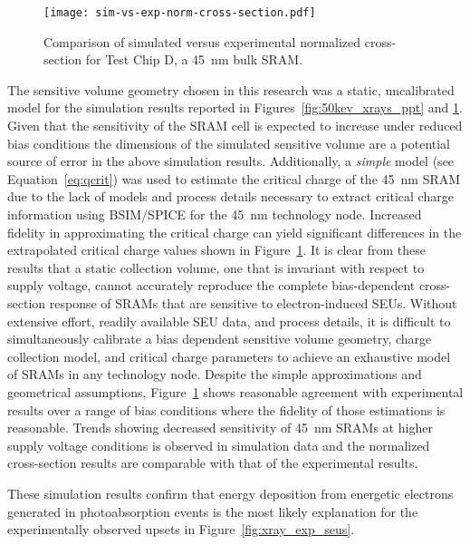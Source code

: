 \begin{figure}[tb]
    \begin{center}
        \texttt{[image: sim-vs-exp-norm-cross-section.pdf]}
    \end{center}
    \caption{Comparison of simulated versus experimental normalized cross-section for Test Chip D, a 45~nm bulk SRAM.}
    \label{fig:sim-vs-exp-norm-cross-section}
\end{figure}

The sensitive volume geometry chosen in this research was a static, uncalibrated model for the simulation results reported in Figures~\ref{fig:50kev_xrays_ppt} and \ref{fig:sim-vs-exp-norm-cross-section}.
Given that the sensitivity of the SRAM cell is expected to increase under reduced bias conditions the dimensions of the simulated sensitive volume are a potential source of error in the above simulation results.
Additionally, a \emph{simple} model (see Equation~\ref{eq:qcrit}) was used to estimate the critical charge of the 45~nm SRAM due to the lack of models and process details necessary to extract critical charge information using BSIM/SPICE for the 45~nm technology node.
Increased fidelity in approximating the critical charge can yield significant differences in the extrapolated critical charge values shown in Figure~\ref{fig:sim-vs-exp-norm-cross-section}.
It is clear from these results that a static collection volume, one that is invariant with respect to supply voltage, cannot accurately reproduce the complete bias-dependent cross-section response of SRAMs that are sensitive to electron-induced SEUs.
Without extensive effort, readily available SEU data, and process details, it is difficult to simultaneously calibrate a bias dependent sensitive volume geometry, charge collection model, and critical charge parameters to achieve an exhaustive model of SRAMs in any technology node.
Despite the simple approximations and geometrical assumptions, Figure~\ref{fig:sim-vs-exp-norm-cross-section} shows reasonable agreement with experimental results over a range of bias conditions where the fidelity of those estimations is reasonable.
Trends showing decreased sensitivity of 45~nm SRAMs at higher supply voltage conditions is observed in simulation data and the normalized cross-section results are comparable with that of the experimental results.

These simulation results confirm that energy deposition from energetic electrons generated in photoabsorption events is the most likely explanation for the experimentally observed upsets in Figure~\ref{fig:xray_exp_seus}. %

